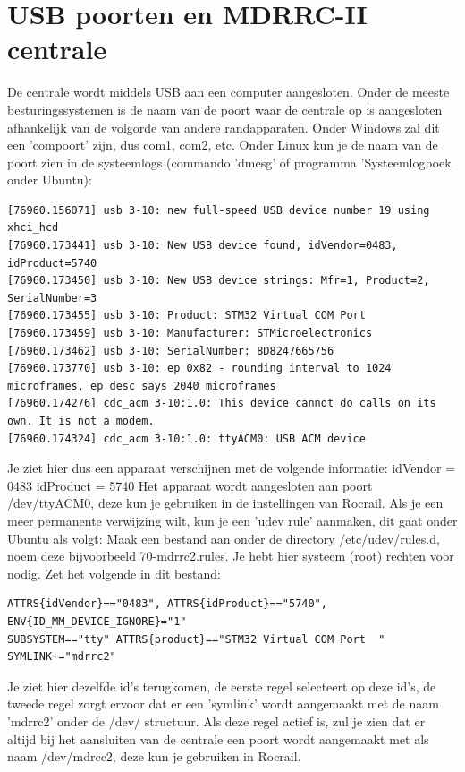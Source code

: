 \documentclass[12pt,a4paper]{report}
\newcommand*{\myfont}{\fontfamily{lmss}\normalsize\selectfont}
\newcommand*{\monofont}{\fontfamily{pcr}\scriptsize\selectfont}
\begin{document}
\chapter{USB poorten en MDRRC-II centrale}
\label{ch:usbports}
De centrale wordt middels USB aan een computer aangesloten. Onder de meeste besturingssystemen is de naam van de poort waar de centrale op is aangesloten afhankelijk van de volgorde van andere randapparaten. Onder Windows zal dit een 'compoort' zijn, dus com1, com2, etc.
Onder Linux kun je de naam van de poort zien in de systeemlogs (commando 'dmesg' of programma 'Systeemlogboek onder Ubuntu):

\monofont
\begin{verbatim}
[76960.156071] usb 3-10: new full-speed USB device number 19 using xhci_hcd 
[76960.173441] usb 3-10: New USB device found, idVendor=0483, idProduct=5740 
[76960.173450] usb 3-10: New USB device strings: Mfr=1, Product=2, SerialNumber=3 
[76960.173455] usb 3-10: Product: STM32 Virtual COM Port  
[76960.173459] usb 3-10: Manufacturer: STMicroelectronics 
[76960.173462] usb 3-10: SerialNumber: 8D8247665756 
[76960.173770] usb 3-10: ep 0x82 - rounding interval to 1024 microframes, ep desc says 2040 microframes 
[76960.174276] cdc_acm 3-10:1.0: This device cannot do calls on its own. It is not a modem. 
[76960.174324] cdc_acm 3-10:1.0: ttyACM0: USB ACM device 
\end{verbatim}
\myfont
Je ziet hier dus een apparaat verschijnen met de volgende informatie:
idVendor = 0483
idProduct = 5740
Het apparaat wordt aangesloten aan poort /dev/ttyACM0, deze kun je gebruiken in de instellingen van Rocrail.
Als je een meer permanente verwijzing wilt, kun je een 'udev rule' aanmaken, dit gaat onder Ubuntu als volgt:
Maak een bestand aan onder de directory /etc/udev/rules.d, noem deze bijvoorbeeld 70-mdrrc2.rules. Je hebt hier systeem (root) rechten voor nodig. Zet het volgende in dit bestand:

\begin{verbatim}
ATTRS{idVendor}=="0483", ATTRS{idProduct}=="5740", ENV{ID_MM_DEVICE_IGNORE}="1" 
SUBSYSTEM=="tty" ATTRS{product}=="STM32 Virtual COM Port  " SYMLINK+="mdrrc2" 
\end{verbatim}

Je ziet hier dezelfde id's terugkomen, de eerste regel selecteert op deze id's, de tweede regel zorgt ervoor dat er een 'symlink' wordt aangemaakt met de naam 'mdrrc2' onder de /dev/ structuur.
Als deze regel actief is, zul je zien dat er altijd bij het aansluiten van de centrale een poort wordt aangemaakt met als naam /dev/mdrcc2, deze kun je gebruiken in Rocrail.
\end{document}
